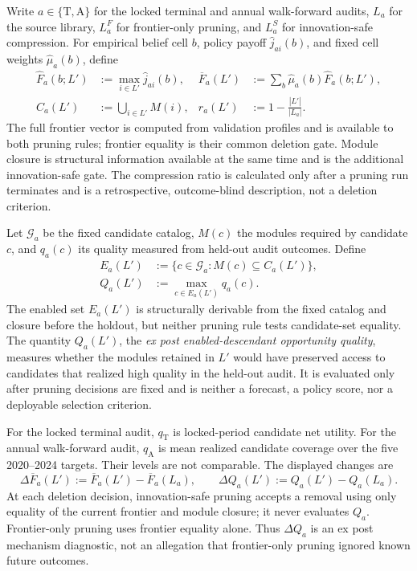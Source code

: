 Write \(a\in\{\mathrm{T},\mathrm{A}\}\) for the locked terminal and annual
walk-forward audits, \(L_a\) for the source library, \(L_a^F\) for
frontier-only pruning, and \(L_a^S\) for innovation-safe compression.  For
empirical belief cell \(b\), policy payoff \(\widehat j_{ai}(b)\), and fixed
cell weights \(\widehat\mu_a(b)\), define
\begin{align}
  \widehat F_a(b;L')
    &:=\max_{i\in L'}\widehat j_{ai}(b),&
  \overline F_a(L')
    &:=\sum_b\widehat\mu_a(b)\widehat F_a(b;L'),
    \label{eq:supp-financial-frontier}\\
  C_a(L')
    &:=\bigcup_{i\in L'}M(i),&
  r_a(L')
    &:=1-\frac{|L'|}{|L_a|}.
    \label{eq:supp-financial-closure-reduction}
\end{align}
The full frontier vector is computed from validation profiles and is available
to both pruning rules; frontier equality is their common deletion gate.
Module closure is structural information available at the same time and is
the additional innovation-safe gate.  The compression ratio is calculated
only after a pruning run terminates and is a retrospective, outcome-blind
description, not a deletion criterion.

Let \(\mathcal G_a\) be the fixed candidate catalog, \(M(c)\) the modules
required by candidate \(c\), and \(q_a(c)\) its quality measured from held-out
audit outcomes.  Define
\begin{align}
  E_a(L')&:=\{c\in\mathcal G_a:M(c)\subseteq C_a(L')\},\nonumber\\
  Q_a(L')&:=\max_{c\in E_a(L')}q_a(c).
  \label{eq:supp-financial-descendant-quality}
\end{align}
The enabled set \(E_a(L')\) is structurally derivable from the fixed catalog
and closure before the holdout, but neither pruning rule tests candidate-set
equality.  The quantity \(Q_a(L')\), the \emph{ex post enabled-descendant
opportunity quality}, measures whether the modules retained in \(L'\) would
have preserved access to candidates that realized high quality in the held-out
audit.  It is evaluated only after pruning decisions are fixed and is neither
a forecast, a policy score, nor a deployable selection criterion.

For the locked terminal audit, \(q_{\mathrm T}\) is locked-period candidate net
utility.  For the annual walk-forward audit, \(q_{\mathrm A}\) is mean realized
candidate coverage over the five 2020--2024 targets.  Their levels are not
comparable.  The displayed changes are
\[
  \Delta\overline F_a(L'):=\overline F_a(L')-\overline F_a(L_a),
  \qquad
  \Delta Q_a(L'):=Q_a(L')-Q_a(L_a).
\]
At each deletion decision, innovation-safe pruning accepts a removal using
only equality of the current frontier and module closure; it never evaluates
\(Q_a\).  Frontier-only pruning uses frontier equality alone.  Thus
\(\Delta Q_a\) is an ex post mechanism diagnostic, not an allegation that
frontier-only pruning ignored known future outcomes.

